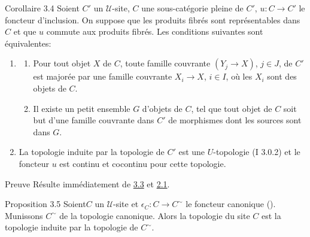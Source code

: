 \begin{enonce*}{Corollaire 3.4}
Soient $C'$ un $𝒰$-site, $C$ une sous-catégorie pleine
de $C'$, $u:C\rightarrow C'$ le foncteur d'inclusion. On suppose que
les produits fibrés sont représentables dans $C$ et que $u$
commute aux produits fibrés. Les conditions suivantes sont
équivalentes:
\begin{enumerate}
\renewcommand{\theenumi}{\roman{enumi}}
\renewcommand{\labelenumi}{\theenumi)}
\item
\begin{enumerate}
\renewcommand{\theenumii}{\alph{enumii}}
\renewcommand{\labelenumii}{\theenumii)}
\item Pour tout objet $X$ de $C$, toute famille couvrante
  $(Y_j\rightarrow X)$, $j\in J$, de $C'$ est majorée par une
  famille couvrante $X_i\rightarrow X$, $i\in I$, où les $X_i$ sont
  des objets de $C$.

\item Il existe un petit ensemble $G$ d'objets de $C$, tel que tout
  objet de $C$ soit but d'une famille couvrante dans $C'$ de
  morphismes dont les sources sont dans $G$.
\end{enumerate}

\item La topologie induite par la topologie de $C'$ est une
  $U$-topologie {\rm (I 3.0.2)} et le foncteur $u$ est continu et
  cocontinu pour cette topologie.
\end{enumerate}
\end{enonce*}

\begin{enonce*}[remark]{Preuve}
Résulte immédiatement de \hyperref[III.cor3.3]{3.3} et \hyperref[III.def2.1]{2.1}.
\end{enonce*}

\begin{enonce*}{Proposition 3.5}
Soient\pageoriginale $C$ un $𝒰$-site et
$\epsilon_C:C\rightarrow C^{\sim}$ le foncteur canonique {\rm
()}. Munissons $C^{\sim}$ de la topologie
canonique. Alors la topologie du site $C$ est la topologie induite
par la topologie de $C^{\sim}$.
\end{enonce*}

